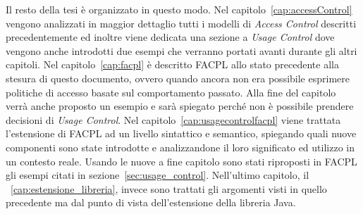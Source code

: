 Il resto della tesi è organizzato in questo modo. Nel capitolo~\ref{cap:accessControl} vengono analizzati in maggior dettaglio tutti i modelli di \textit{Access Control} descritti precedentemente ed inoltre viene dedicata una sezione a \textit{Usage Control} dove vengono anche introdotti due esempi che verranno portati avanti durante gli altri capitoli. Nel capitolo~\ref{cap:facpl} è descritto FACPL allo stato precedente alla stesura di questo documento, ovvero quando ancora non era possibile esprimere politiche di accesso basate sul comportamento passato. Alla fine del capitolo verrà anche proposto un esempio e sarà spiegato perché non è possibile prendere decisioni di \textit{Usage Control}. Nel capitolo~\ref{cap:usagecontrolfacpl} viene trattata l'estensione di FACPL ad un livello sintattico e semantico, spiegando quali nuove componenti sono state introdotte e analizzandone il loro significato ed utilizzo in un contesto reale. Usando le nuove a fine capitolo sono stati riproposti in FACPL gli esempi citati in sezione~\ref{sec:usage_control}. Nell'ultimo capitolo, il ~\ref{cap:estensione_libreria}, invece sono trattati gli argomenti visti in quello precedente ma dal punto di vista dell'estensione della libreria Java.
